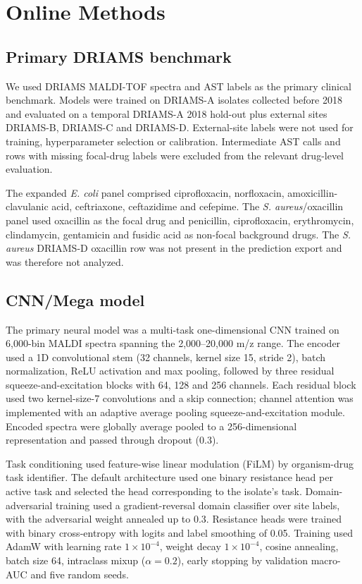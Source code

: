 \documentclass[11pt]{article}
\begin{document}
\section*{Online Methods}

\subsection*{Primary DRIAMS benchmark}

We used DRIAMS MALDI-TOF spectra and AST labels as the primary clinical benchmark\cite{weis2022driams,driamsdryad}. Models were trained on DRIAMS-A isolates collected before 2018 and evaluated on a temporal DRIAMS-A 2018 hold-out plus external sites DRIAMS-B, DRIAMS-C and DRIAMS-D. External-site labels were not used for training, hyperparameter selection or calibration. Intermediate AST calls and rows with missing focal-drug labels were excluded from the relevant drug-level evaluation.

The expanded \textit{E. coli} panel comprised ciprofloxacin, norfloxacin, amoxicillin-clavulanic acid, ceftriaxone, ceftazidime and cefepime. The \textit{S. aureus}/oxacillin panel used oxacillin as the focal drug and penicillin, ciprofloxacin, erythromycin, clindamycin, gentamicin and fusidic acid as non-focal background drugs. The \textit{S. aureus} DRIAMS-D oxacillin row was not present in the prediction export and was therefore not analyzed.

\subsection*{CNN/Mega model}

The primary neural model was a multi-task one-dimensional CNN trained on 6,000-bin MALDI spectra spanning the 2,000--20,000 m/z range. The encoder used a 1D convolutional stem (32 channels, kernel size 15, stride 2), batch normalization, ReLU activation and max pooling, followed by three residual squeeze-and-excitation blocks with 64, 128 and 256 channels. Each residual block used two kernel-size-7 convolutions and a skip connection; channel attention was implemented with an adaptive average pooling squeeze-and-excitation module. Encoded spectra were globally average pooled to a 256-dimensional representation and passed through dropout (0.3).

Task conditioning used feature-wise linear modulation (FiLM) by organism-drug task identifier. The default architecture used one binary resistance head per active task and selected the head corresponding to the isolate's task. Domain-adversarial training used a gradient-reversal domain classifier over site labels, with the adversarial weight annealed up to 0.3. Resistance heads were trained with binary cross-entropy with logits and label smoothing of 0.05. Training used AdamW with learning rate $1\times10^{-4}$, weight decay $1\times10^{-4}$, cosine annealing, batch size 64, intraclass mixup ($\alpha=0.2$), early stopping by validation macro-AUC and five random seeds.
\end{document}
